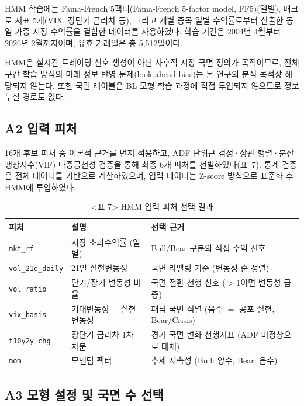 \documentclass{article}
\begin{document}
HMM 학습에는 Fama-French 5팩터(Fama-French 5-factor model, FF5)(일별), 매크로 지표 5개(VIX, 장단기 금리차 등), 그리고 개별 종목 일별 수익률로부터 산출한 동일 가중 시장 수익률을 결합한 데이터를 사용하였다. 학습 기간은 2004년 4월부터 2026년 2월까지이며, 유효 거래일은 총 5,512일이다.

HMM은 실시간 트레이딩 신호 생성이 아닌 사후적 시장 국면 정의가 목적이므로, 전체 구간 학습 방식의 미래 정보 반영 문제(look-ahead bias)는 본 연구의 분석 목적상 해당되지 않는다. 또한 국면 레이블은 BL 모형 학습 과정에 직접 투입되지 않으므로 정보 누설 경로도 없다.

\subsection*{A2 입력 피처}

16개 후보 피처 중 이론적 근거를 먼저 적용하고, ADF 단위근 검정·상관 행렬·분산팽창지수(VIF) 다중공선성 검증을 통해 최종 6개 피처를 선별하였다(표~7). 통계 검증은 전체 데이터를 기반으로 계산하였으며, 입력 데이터는 Z-score 방식으로 표준화 후 HMM에 투입하였다.

\begin{table}[ht]
\centering
\caption{<표 7> HMM 입력 피처 선택 결과}
\label{tab:a1_features}
\begin{tabular}{lll}
\toprule
\textbf{피처} & \textbf{설명} & \textbf{선택 근거} \\
\midrule
\texttt{mkt\_rf}       & 시장 초과수익률 (일별)     & Bull/Bear 구분의 직접 수익 신호 \\
\texttt{vol\_21d\_daily} & 21일 실현변동성           & 국면 라벨링 기준 (변동성 순 정렬) \\
\texttt{vol\_ratio}    & 단기/장기 변동성 비율      & 국면 전환 선행 신호 ($>$1이면 변동성 급증) \\
\texttt{vix\_basis}    & 기대변동성 $-$ 실현변동성  & 패닉 국면 식별 (음수 $=$ 공포 실현, Bear/Crisis) \\
\texttt{t10y2y\_chg}   & 장단기 금리차 1차 차분     & 경기 국면 변화 선행지표 (ADF 비정상으로 대체) \\
\texttt{mom}           & 모멘텀 팩터               & 추세 지속성 (Bull: 양수, Bear: 음수) \\
\bottomrule
\end{tabular}
\end{table}

\subsection*{A3 모형 설정 및 국면 수 선택}
\end{document}
